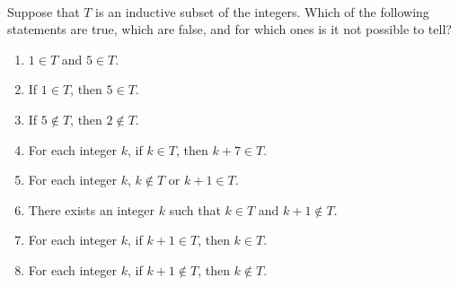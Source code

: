 \begin{prog} \label{prog:inductivesets} \hfill \\
Suppose that $T$ is an inductive subset of the integers.  Which of the following statements are true, which are false, and for which ones is it not possible to tell?

\begin{multicols}{2}
\begin{enumerate}
\item $1 \in T$ and $5 \in T$\!.

\item If $1 \in T$, then $5 \in T$\!.

\item If $5 \notin T$\!, then $2 \notin T$\!.

\item For each integer $k$, if $k \in T$\!, then $k + 7 \in T$.

\item For each integer $k$, $k \notin T$ or $k + 1 \in T$.

\item There exists an integer $k$ such that $k \in T$ and $k + 1 \notin T$\!.

\item For each integer $k$, if $k + 1 \in T$\!, then $k \in T$\!.

\item For each integer $k$, if $k + 1 \notin T$\!, then $k \notin T$\!.
\end{enumerate}
\end{multicols}
\end{prog}
\hbreak

\endinput
